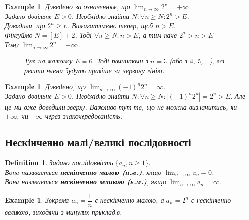 \documentclass[a4paper, 14pt]{article}
\theoremstyle{theoremdd}
\theoremstyle{theoremdd}
\newtheorem{definition}[theorem]{Definition}
\theoremstyle{theoremdd}
\theoremstyle{theoremdd}
\newtheorem{example}[theorem]{Example}
\theoremstyle{theoremdd}
\theoremstyle{theoremdd}
\theoremstyle{theoremdd}
\theoremstyle{theoremdd}
\begin{document}
	\begin{example}
	Доведемо за означенням, що $\displaystyle\lim_{n \to \infty} 2^n = +\infty$.\\
	Задано довільне $E>0$. Необхідно знайти $N: \forall n \geq N: 2^n>E$.\\
	Доводили, що $2^n \geq n$. Вимагатимемо тепер, щоб $n > E$.\\
	Фіксуймо $N=\left[ E \right] + 2$. Тоді $\forall n \geq N: n > E$, а тим паче $2^n > n > E$\\
	Тому $\displaystyle\lim_{n \to \infty} 2^n = +\infty$.
	\begin{figure}[H]
\centering
\resizebox{0.9\textwidth}{!} {
}
\caption*{Тут на малюнку $E = 6$. Тоді починаючи з $n=3$ (або з $4$, $5$,...), всі решта члени будуть правіше за червону лінію.}
\end{figure}
	\end{example}

\begin{example}
Доведемо, що $\displaystyle \lim_{n \to \infty} (-1)^n 2^n = \infty$.\\
Задано довільне $E > 0$. Необхідно знайти $N: \forall n \geq N: |(-1)^n 2^n| = 2^n > E$.
Але це ми вже доводили зверху. Важливо тут те, що не можна визначитись, чи $+\infty$, чи $-\infty$ через знакочередованість.
\end{example}
	
	
	\subsection{Нескінченно малі/великі послідовності}
	\begin{definition}
	Задано послідовність $\{a_n, n \geq 1\}$.\\
	Вона називається \textbf{нескінченно малою (н.м.)}, якщо $\displaystyle\lim_{n \to \infty} a_n = 0$.\\
	Вона називається \textbf{нескінченно великою (н.м.)}, якщо $\displaystyle\lim_{n \to \infty} a_n = \infty$.\\
	\end{definition}
	
	\begin{example}
	Зокрема $a_n = \dfrac{1}{n}$ є нескінченно малою, а $a_n = 2^n$ є нескінченно великою, виходячи з минулих прикладів.
	\end{example}
	
\end{document}
